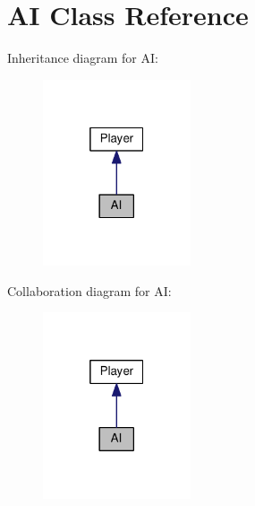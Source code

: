 \hypertarget{classAI}{}\section{AI Class Reference}
\label{classAI}


Inheritance diagram for AI\+:
\nopagebreak
\begin{figure}[H]
\begin{center}
\leavevmode
\includegraphics[width=124pt]{classAI__inherit__graph}
\end{center}
\end{figure}


Collaboration diagram for AI\+:
\nopagebreak
\begin{figure}[H]
\begin{center}
\leavevmode
\includegraphics[width=124pt]{classAI__coll__graph}
\end{center}
\end{figure}
